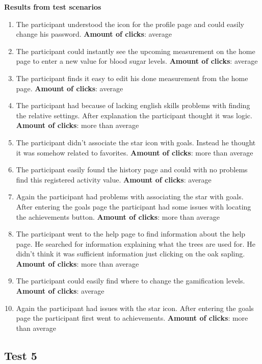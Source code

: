 \noindent\textbf{Results from test scenarios}
\begin{enumerate}
\item The participant understood the icon for the profile page and could easily change his password.
\subitem \textbf{Amount of clicks}: average
\item The participant could instantly see the upcoming measurement on the home page to enter a new value for blood sugar levels.
\subitem \textbf{Amount of clicks}: average
\item The participant finds it easy to edit his done measurement from the home page.
\subitem \textbf{Amount of clicks}: average
\item The participant had because of lacking english skills problems with finding the relative settings. After explanation the participant thought it was logic. 
\subitem \textbf{Amount of clicks}: more than average
\item The participant didn’t associate the star icon with goals. Instead he thought it was somehow related to favorites. 
\subitem \textbf{Amount of clicks}: more than average
\item The participant easily found the history page and could with no problems find this registered activity value. 
\subitem \textbf{Amount of clicks}: average
\item Again the participant had problems with associating the star with goals. After entering the goals page the participant had some issues with locating the achievements button.
\subitem \textbf{Amount of clicks}: more than average
\item The participant went to the help page to find information about the help page. He searched for information explaining what the trees are used for. He didn’t think it was sufficient information just clicking on the oak sapling. 
\subitem \textbf{Amount of clicks}: more than average
\item The participant could easily find where to change the gamification levels.
\subitem \textbf{Amount of clicks}: average
\item Again the participant had issues with the star icon. After entering the goals page the participant first went to achievements. 
\subitem \textbf{Amount of clicks}: more than average
\end{enumerate}


\subsection{Test 5}

